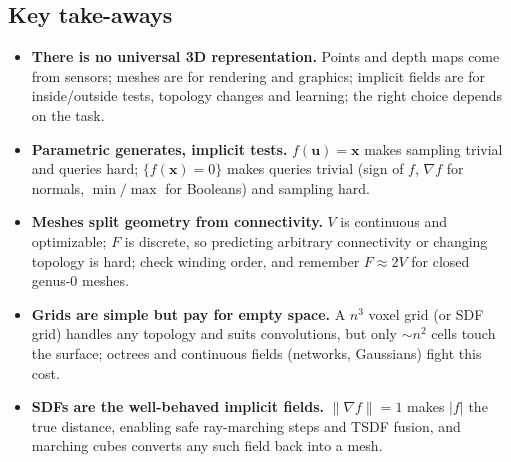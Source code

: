 \documentclass[11pt,a4paper]{article}
\newcommand{\Surf}{\mathcal{S}}
\newcommand{\vx}{\bm{x}}
\newcommand{\vu}{\bm{u}}
\newcommand{\norm}[1]{\lVert #1\rVert}
\theoremstyle{definition}
\newtheorem{definition}{Definition}[section]
\theoremstyle{plain}
\theoremstyle{remark}
\newcommand{\slides}[1]{\texorpdfstring{\emph{(#1)}}{(#1)}}
\begin{document}
\subsection*{Key take-aways}
\begin{itemize}
\item \textbf{There is no universal 3D representation.} Points and depth maps come from sensors; meshes are for rendering and graphics; implicit fields are for inside/outside tests, topology changes and learning; the right choice depends on the task.
\item \textbf{Parametric generates, implicit tests.} $f(\vu)=\vx$ makes sampling trivial and queries hard; $\{f(\vx)=0\}$ makes queries trivial (sign of $f$, $\nabla f$ for normals, $\min/\max$ for Booleans) and sampling hard.
\item \textbf{Meshes split geometry from connectivity.} $V$ is continuous and optimizable; $F$ is discrete, so predicting arbitrary connectivity or changing topology is hard; check winding order, and remember $F\approx2V$ for closed genus-0 meshes.
\item \textbf{Grids are simple but pay for empty space.} A $n^3$ voxel grid (or SDF grid) handles any topology and suits convolutions, but only $\sim n^2$ cells touch the surface; octrees and continuous fields (networks, Gaussians) fight this cost.
\item \textbf{SDFs are the well-behaved implicit fields.} $\norm{\nabla f}=1$ makes $|f|$ the true distance, enabling safe ray-marching steps and TSDF fusion, and marching cubes converts any such field back into a mesh.
\end{itemize}


\end{document}
